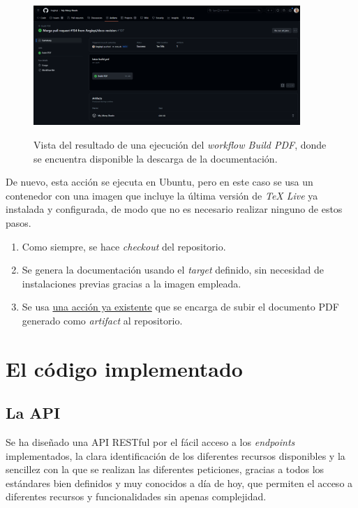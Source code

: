 \begin{figure}[H]
    \includegraphics[width=0.9\textwidth]{img/artifact_download.png}\\[1.4cm]
    \caption{Vista del resultado de una ejecución del \textit{workflow Build PDF}, donde se encuentra disponible la descarga de la documentación.}
\end{figure}

De nuevo, esta acción se ejecuta en Ubuntu, pero en este caso se usa un contenedor con una imagen que incluye la última versión de \textit{TeX Live} ya instalada y configurada, de modo que no es necesario realizar ninguno de estos pasos.

\begin{enumerate}
    \item Como siempre, se hace \textit{checkout} del repositorio.
    \item Se genera la documentación usando el \textit{target} definido, sin necesidad de instalaciones previas gracias a la imagen empleada.
    \item Se usa \href{https://github.com/marketplace/actions/upload-a-build-artifact}{una acción ya existente} que se encarga de subir el documento PDF generado como \textit{artifact} al repositorio.
\end{enumerate}

\section{El código implementado}

\subsection{La API}
\label{api}

Se ha diseñado una API RESTful por el fácil acceso a los \textit{endpoints} implementados, la clara identificación de los diferentes recursos disponibles y la sencillez con la que se realizan las diferentes peticiones, gracias a todos los estándares bien definidos y muy conocidos a día de hoy, que permiten el acceso a diferentes recursos y funcionalidades sin apenas complejidad.


